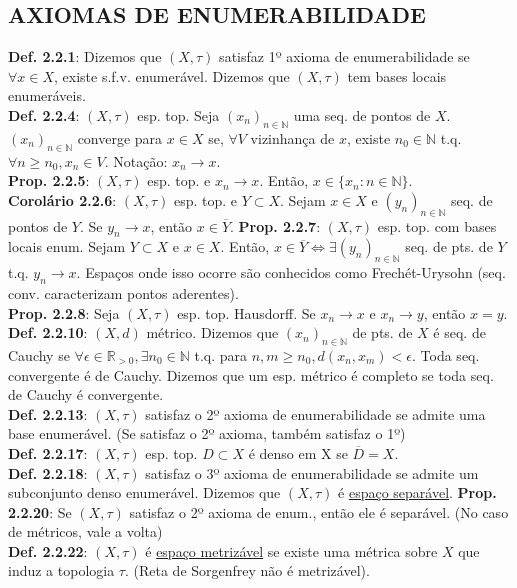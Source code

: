 \documentclass{article}
\begin{document}
\begin{landscape}
\begin{center}
\section{AXIOMAS DE ENUMERABILIDADE}
\end{center}
\begin{multicols}{3}
\textbf{Def. 2.2.1}: Dizemos que $(X, \tau)$ satisfaz 1º axioma de enumerabilidade se $\forall x \in X$, existe s.f.v. enumerável. Dizemos que $(X,\tau)$ tem bases locais enumeráveis.\\
\textbf{Def. 2.2.4}: $(X, \tau)$ esp. top. Seja $(x_n)_{n \in \mathbb{N}}$ uma seq. de pontos de $X$. $(x_n)_{n \in \mathbb{N}}$ converge para $x \in X$ se, $\forall V$ vizinhança de $x$, existe $n_0 \in \mathbb{N}$ t.q. $\forall n \geq n_0, x_n \in V$. Notação: $x_n \rightarrow x$.\\
\textbf{Prop. 2.2.5}: $(X, \tau)$ esp. top. e $x_n \rightarrow x$. Então, $x \in \{x_n: n\in \mathbb{N}\}$.\\
\textbf{Corolário 2.2.6}: $(X, \tau)$ esp. top. e $Y \subset X$. Sejam $x\in X$ e $(y_n)_{n \in \mathbb{N}}$ seq. de pontos de $Y$. Se $y_n \rightarrow x$, então $x \in \overline{Y}$.
\textbf{Prop. 2.2.7}: $(X, \tau)$ esp. top. com bases locais enum. Sejam $Y \subset X$ e $x \in X$. Então, $x \in \overline{Y} \iff \exists(y_n)_{n \in \mathbb{N}}$ seq. de pts. de $Y$ t.q. $y_n \rightarrow x$. Espaços onde isso ocorre são conhecidos como Frechét-Urysohn (seq. conv. caracterizam pontos aderentes).\\
\textbf{Prop. 2.2.8}: Seja $(X, \tau)$ esp. top. Hausdorff. Se $x_n \rightarrow x$ e $x_n \rightarrow y$, então $x = y$.\\
\textbf{Def. 2.2.10}: $(X, d)$ métrico. Dizemos que $(x_n)_{n\in \mathbb{N}}$ de pts. de $X$ é seq. de Cauchy se $\forall \epsilon \in \mathbb{R}_{>0},\exists n_0 \in \mathbb{N}$ t.q. para $n,m \geq n_0, d(x_n,x_m)<\epsilon$. Toda seq. convergente é de Cauchy. Dizemos que um esp. métrico é completo se toda seq. de Cauchy é convergente.\\
\textbf{Def. 2.2.13}: $(X, \tau)$ satisfaz o 2º axioma de enumerabilidade se admite uma base enumerável. (Se satisfaz o 2º axioma, também satisfaz o 1º)\\
\textbf{Def. 2.2.17}: $(X, \tau)$ esp. top. $D \subset X$ é denso em X se $\overline{D} = X$.\\
\textbf{Def. 2.2.18}: $(X, \tau)$ satisfaz o 3º axioma de enumerabilidade se admite um subconjunto denso enumerável. Dizemos que $(X, \tau)$ é \underline{espaço separável}.
\textbf{Prop. 2.2.20}: Se $(X, \tau)$ satisfaz o 2º axioma de enum., então ele é separável. (No caso de métricos, vale a volta)\\
\textbf{Def. 2.2.22}: $(X, \tau)$ é \underline{espaço metrizável} se existe uma métrica sobre $X$ que induz a topologia $\tau$. (Reta de Sorgenfrey não é metrizável).
\end{multicols}
\begin{center}


\end{center}
\end{landscape}
\end{document}

